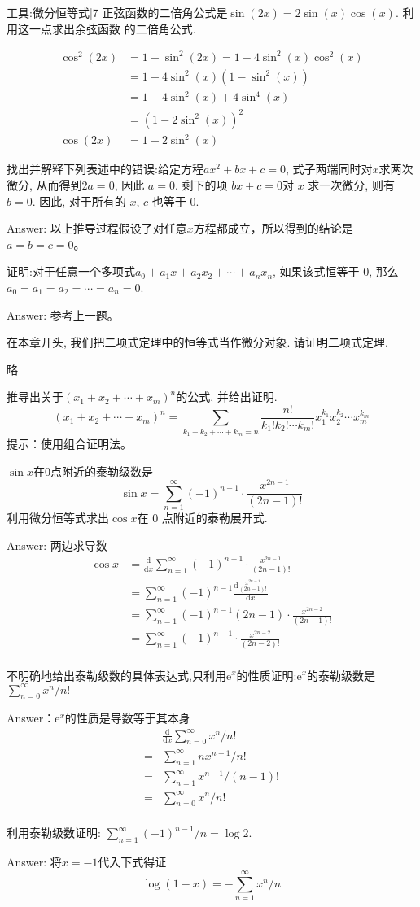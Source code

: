 \newChapter 工具:微分恒等式|7
\exer 正弦函数的二倍角公式是$\sin(2x) = 2\sin(x)\cos(x)$. 利用这一点求出余弦函数 的二倍角公式.\par
\begin{align*}
\cos^2(2x) & = 1-\sin^2(2x) = 1 - 4\sin^2(x)\cos^2(x) \\
& = 1 - 4\sin^2(x)(1-\sin^2(x)) \\
& = 1 - 4\sin^2(x)+4\sin^4(x) \\
& = (1 - 2\sin^2(x))^2 \\
\cos(2x)&=1-2\sin^2(x)
\end{align*}

\exer 找出并解释下列表述中的错误:给定方程$ax^2 + bx + c = 0$, 式子两端同时对$x$求两次微分, 从而得到$2a = 0$, 因此 $a = 0$. 剩下的项 $bx + c = 0 $对 $x$ 求一次微分, 则有 $b = 0$. 因此, 对于所有的 $x$, $c$ 也等于 0.\par
Answer: 以上推导过程假设了对任意$x$方程都成立，所以得到的结论是$a=b=c=0$。

\exer 证明:对于任意一个多项式$a_0 + a_1x + a_2x_2 +\cdots+ a_nx_n$, 如果该式恒等于 0, 那么$a_0 =a_1 =a_2 =\cdots=a_n =0$.\par
Answer: 参考上一题。

\exer 在本章开头, 我们把二项式定理中的恒等式当作微分对象. 请证明二项式定理.\par
略

\exer 推导出关于$(x_1 + x_2 +\cdots + x_m)^n$的公式, 并给出证明.
\[(x_1 + x_2 +\cdots + x_m)^n=\sum_{k_1+k_2+\cdots+k_m=n}\frac{n!}{k_1!k_2!\cdots k_m!}x_1^{k_1}x_2^{k_2}\cdots x_m^{k_m}\]
提示：使用组合证明法。

\exer $\sin x$在0点附近的泰勒级数是
\[\sin x =\sum_{n=1}^\infty(-1)^{n-1}\cdot\frac{x^{2n-1}}{(2n-1)!}\]
利用微分恒等式求出$\cos x$在 0 点附近的泰勒展开式.\par
Answer: 两边求导数
\begin{align*}
\cos x &= \frac{\mathrm d}{\mathrm d x}\sum_{n=1}^\infty(-1)^{n-1}\cdot\frac{x^{2n-1}}{(2n-1)!} \\
&=\sum_{n=1}^\infty(-1)^{n-1}\frac{\mathrm d \frac{x^{2n-1}}{(2n-1)!} }{\mathrm d x} \\
&=\sum_{n=1}^\infty(-1)^{n-1}(2n-1)\cdot\frac{x^{2n-2}}{(2n-1)!} \\
&=\sum_{n=1}^\infty(-1)^{n-1}\cdot\frac{x^{2n-2}}{(2n-2)!} \\
\end{align*}

\exer 不明确地给出泰勒级数的具体表达式,只利用$\mathrm{e}^x$的性质证明:$\mathrm{e}^x$的泰勒级数是$\sum\limits_{n=0}^\infty x^n/n!$\par
Answer：$\mathrm{e}^x$的性质是导数等于其本身
\begin{align*}
&\frac{\mathrm d}{\mathrm dx} \sum_{n=0}^\infty x^n/n!\\
=&\sum_{n=1}^\infty nx^{n-1}/n! \\
=&\sum_{n=1}^\infty x^{n-1}/(n-1)! \\
=&\sum_{n=0}^\infty x^{n}/n! \\
\end{align*}

\exer 利用泰勒级数证明: $\sum_{n=1}^\infty(-1)^{n-1} /n = \log 2$.\par
Answer: 将$x=-1$代入下式得证
\[\log(1-x)=-\sum_{n=1}^\infty x^n /n\]